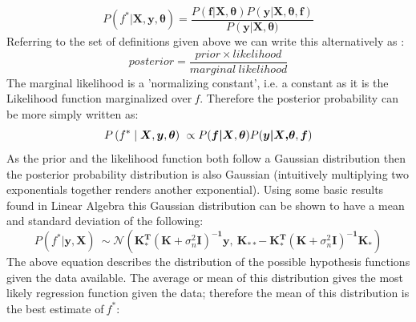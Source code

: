 \documentclass[10.5pt,a4paper,twoside]{report}   %
\begin{document}
\begin{equation}
P\left(f^*| \boldsymbol{X},\boldsymbol{y},\boldsymbol{\theta }\right)
=
\frac{P\left(\boldsymbol{f}|\boldsymbol{X}\boldsymbol{, }\boldsymbol{\theta }\right)P(\boldsymbol{y}|\boldsymbol{X}\boldsymbol{, }\boldsymbol{\theta },\boldsymbol{f})}{P\left(\boldsymbol{y}\right|\boldsymbol{X}\boldsymbol{, }\boldsymbol{\theta })}
\end{equation}
Referring to the set of definitions given above we can write this alternatively as \cite{MITGPRbook}:
\begin{equation}
posterior=\frac{prior\times likelihood}{marginal\ likelihood}
\end{equation}
The marginal likelihood is a 'normalizing constant', i.e. a constant as it is the Likelihood function marginalized over$\ f$. Therefore the posterior probability can be more simply written as\cite{MITGPRbook,camgpr,edsnelgpr}:
\begin{equation}
P\left(f^*\mathrel{|\vphantom{f^\ast \boldsymbol{X},\boldsymbol{y},\boldsymbol{\theta }}}\boldsymbol{X},\boldsymbol{y},\boldsymbol{\theta }\right)\ \propto P(\boldsymbol{f}\boldsymbol{|}\boldsymbol{X},\boldsymbol{\theta })P(\boldsymbol{y}\boldsymbol{|}\boldsymbol{X}\boldsymbol{, }\boldsymbol{\theta },\boldsymbol{f})
\end{equation} 
As the prior and the likelihood function both follow a Gaussian distribution then the posterior probability distribution is also Gaussian (intuitively multiplying two exponentials together renders another exponential). Using some basic results found in Linear Algebra \cite{UManMND} this Gaussian distribution can be shown to have a mean and standard deviation of the following\cite{MITGPRbook}:
\begin{equation}
P\left(f^*|\boldsymbol{y}\boldsymbol{,}\boldsymbol{X}\right)\ \sim \mathcal{N}({\boldsymbol{K}}^{\boldsymbol{T}}_{\boldsymbol{*}}{\left(\boldsymbol{K}+{\sigma }^2_n\boldsymbol{I}\right)}^{\boldsymbol{-}\boldsymbol{1}}\boldsymbol{y}\boldsymbol{,}{\boldsymbol{\ }\boldsymbol{K}}_{\boldsymbol{**}}\boldsymbol{-}\boldsymbol{\ }{\boldsymbol{K}}^{\boldsymbol{T}}_{\boldsymbol{*}}{\left(\boldsymbol{K}+{\sigma }^2_n\boldsymbol{I}\right)}^{\boldsymbol{-}\boldsymbol{1}}{\boldsymbol{K}}_{\boldsymbol{*}})
\end{equation}
The above equation describes the distribution of the possible hypothesis functions given the data available. The average or mean of this distribution gives the most likely regression function given the data; therefore the mean of this distribution is the best estimate of$\ f^\ast$:
\end{document}
